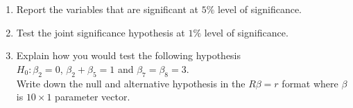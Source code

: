 \documentclass[12pt,a4paper]{article}
\begin{document}
\begin{enumerate}
\item{Report the variables that are significant at $5\%$ level of significance.}
\item{Test the joint significance hypothesis at $1\%$ level of significance.}
\item{Explain how you would test the following hypothesis}\\
$H_{0}: \beta_{2}=0$, $\beta_{2}+\beta_{5}=1$ and $\beta_{7}=\beta_{8}=3$.\\

Write down the null and alternative hypothesis in the $R\beta=r$ format where $\beta$ is $10 \times 1$ parameter vector.
\end{enumerate}
\end{document}
